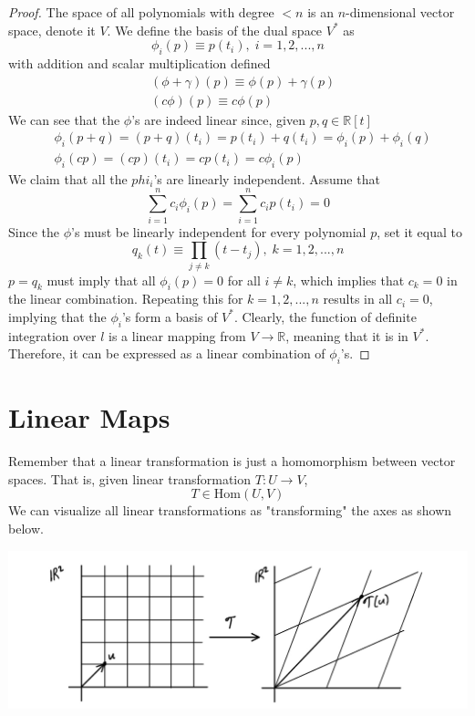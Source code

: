 \documentclass{article}
\theoremstyle{remark}
\theoremstyle{definition}
\begin{document}
\begin{proof}
The space of all polynomials with degree $< n$ is an $n$-dimensional vector space, denote it $V$. We define the basis of the dual space $V^*$ as 
\[\phi_i (p) \equiv p(t_i), \; i = 1, 2, ..., n\]
with addition and scalar multiplication defined
\begin{align*}
    & (\phi + \gamma) (p) \equiv \phi(p) + \gamma(p) \\
    & (c \phi) (p) \equiv c \phi (p) 
\end{align*}
We can see that the $\phi$'s are indeed linear since, given $p, q \in \mathbb{R}[t]$
\begin{align*}
    & \phi_i (p + q) = (p + q) (t_i) = p(t_i) + q(t_i) = \phi_i (p) + \phi_i (q) \\
    & \phi_i (c p) = (c p) (t_i) = c p(t_i) = c \phi_i (p)
\end{align*}
We claim that all the $phi_i$'s are linearly independent. Assume that \[\sum_{i=1}^n c_i \phi_i (p) = \sum_{i=1}^n c_i p(t_i) = 0\]
Since the $\phi$'s must be linearly independent for every polynomial $p$, set it equal to
\[q_k (t) \equiv \prod_{j \neq k} (t - t_j), \; k = 1, 2, ..., n\]
$p = q_k$ must imply that all $\phi_i (p) = 0$ for all $i \neq k$, which implies that $c_k = 0$ in the linear combination. Repeating this for $k = 1, 2, ..., n$ results in all $c_i = 0$, implying that the $\phi_i$'s form a basis of $V^*$. Clearly, the function of definite integration over $l$ is a linear mapping from $V \longrightarrow \mathbb{R}$, meaning that it is in $V^*$. Therefore, it can be expressed as a linear combination of $\phi_i$'s. 
\end{proof}

\section{Linear Maps}
Remember that a linear transformation is just a homomorphism between vector spaces. That is, given linear transformation $T: U \longrightarrow V$, 
\[T \in \text{Hom}(U,V)\]
We can visualize all linear transformations as "transforming" the axes as shown below. 
\begin{center}
  \includegraphics[scale=0.25]{img/Linear_Map.PNG}
\end{center}
\end{document}
